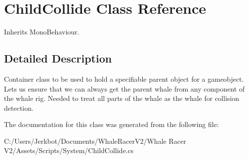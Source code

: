 \hypertarget{class_child_collide}{}\section{Child\+Collide Class Reference}
\label{class_child_collide}


Inherits Mono\+Behaviour.



\subsection{Detailed Description}
Container class to be used to hold a specifiable parent object for a gameobject. Lets us ensure that we can always get the parent whale from any component of the whale rig. Needed to treat all parts of the whale as the whale for collision detection. 



The documentation for this class was generated from the following file\+:\begin{DoxyCompactItemize}
\item 
C\+:/\+Users/\+Jerkbot/\+Documents/\+Whale\+Racer\+V2/\+Whale Racer V2/\+Assets/\+Scripts/\+System/Child\+Collide.\+cs\end{DoxyCompactItemize}
